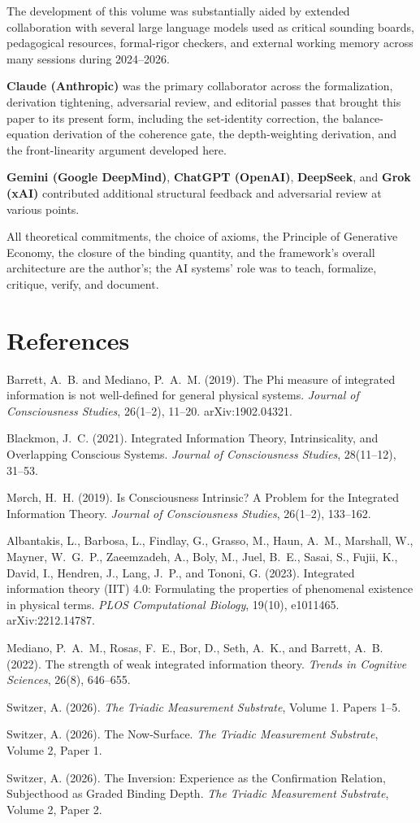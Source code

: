 \documentclass[11pt,oneside]{report}
\theoremstyle{definition}
\theoremstyle{remark}
\newenvironment{reflist}
  {\par\small\setlength{\parindent}{0pt}%
   \setlength{\leftskip}{1.6em}\setlength{\parindent}{-1.6em}%
   \setlength{\parskip}{0.4em}%
   \raggedright\hyphenpenalty=50\exhyphenpenalty=50\relax
   \sloppy}
  {\par}
\begin{document}
The development of this volume was substantially aided by extended
collaboration with several large language models used as critical
sounding boards, pedagogical resources, formal-rigor checkers, and
external working memory across many sessions during 2024--2026.

\textbf{Claude (Anthropic)} was the primary collaborator across the
formalization, derivation tightening, adversarial review, and editorial
passes that brought this paper to its present form, including the
set-identity correction, the balance-equation derivation of the coherence
gate, the depth-weighting derivation, and the front-linearity argument
developed here.

\textbf{Gemini (Google DeepMind)}, \textbf{ChatGPT (OpenAI)},
\textbf{DeepSeek}, and \textbf{Grok (xAI)} contributed additional
structural feedback and adversarial review at various points.

All theoretical commitments, the choice of axioms, the Principle of
Generative Economy, the closure of the binding quantity, and the
framework's overall architecture are the author's; the AI systems' role
was to teach, formalize, critique, verify, and document.

\section*{References}
\begin{reflist}
Barrett, A.~B. and Mediano, P.~A.~M. (2019). The Phi
measure of integrated information is not well-defined for general physical
systems. \textit{Journal of Consciousness Studies}, 26(1--2), 11--20.
arXiv:1902.04321.

Blackmon, J.~C. (2021). Integrated Information Theory,
Intrinsicality, and Overlapping Conscious Systems. \textit{Journal of
Consciousness Studies}, 28(11--12), 31--53.

Mørch, H.~H. (2019). Is Consciousness Intrinsic? A Problem
for the Integrated Information Theory. \textit{Journal of Consciousness
Studies}, 26(1--2), 133--162.

Albantakis, L., Barbosa, L., Findlay, G., Grasso, M.,
Haun, A.~M., Marshall, W., Mayner, W.~G.~P., Zaeemzadeh, A., Boly, M.,
Juel, B.~E., Sasai, S., Fujii, K., David, I., Hendren, J., Lang, J.~P., and
Tononi, G. (2023). Integrated information theory (IIT) 4.0: Formulating the
properties of phenomenal existence in physical terms. \textit{PLOS
Computational Biology}, 19(10), e1011465. arXiv:2212.14787.

Mediano, P.~A.~M., Rosas, F.~E., Bor, D., Seth, A.~K.,
and Barrett, A.~B. (2022). The strength of weak integrated information theory.
\textit{Trends in Cognitive Sciences}, 26(8), 646--655.

Switzer, A. (2026). \textit{The Triadic Measurement
Substrate}, Volume 1. Papers 1--5.

Switzer, A. (2026). The Now-Surface. \textit{The
Triadic Measurement Substrate}, Volume 2, Paper 1.

Switzer, A. (2026). The Inversion: Experience as the
Confirmation Relation, Subjecthood as Graded Binding Depth. \textit{The Triadic
Measurement Substrate}, Volume 2, Paper 2.
\end{reflist}
\end{document}
